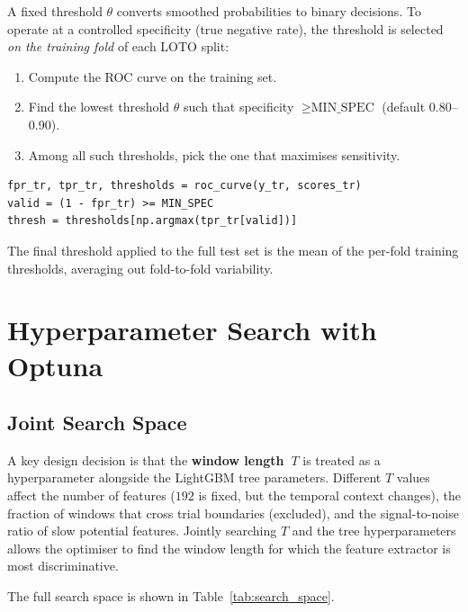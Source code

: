 \documentclass[12pt,a4paper]{article}
\begin{document}
A fixed threshold $\theta$ converts smoothed probabilities to binary
decisions. To operate at a controlled specificity (true negative rate), the
threshold is selected \emph{on the training fold} of each LOTO split:

\begin{enumerate}[leftmargin=1.5em]
  \item Compute the ROC curve on the training set.
  \item Find the lowest threshold $\theta$ such that specificity
        $\geq \text{MIN\_SPEC}$ (default 0.80--0.90).
  \item Among all such thresholds, pick the one that maximises sensitivity.
\end{enumerate}

\begin{lstlisting}[style=pycode]
fpr_tr, tpr_tr, thresholds = roc_curve(y_tr, scores_tr)
valid = (1 - fpr_tr) >= MIN_SPEC
thresh = thresholds[np.argmax(tpr_tr[valid])]
\end{lstlisting}

The final threshold applied to the full test set is the mean of the
per-fold training thresholds, averaging out fold-to-fold variability.

\section{Hyperparameter Search with Optuna}

\subsection{Joint Search Space}

A key design decision is that the \textbf{window length~$T$} is treated as
a hyperparameter alongside the LightGBM tree parameters. Different $T$
values affect the number of features ($192$ is fixed, but the temporal
context changes), the fraction of windows that cross trial boundaries
(excluded), and the signal-to-noise ratio of slow potential features. Jointly
searching $T$ and the tree hyperparameters allows the optimiser to
find the window length for which the feature extractor is most
discriminative.

The full search space is shown in Table~\ref{tab:search_space}.
\end{document}
